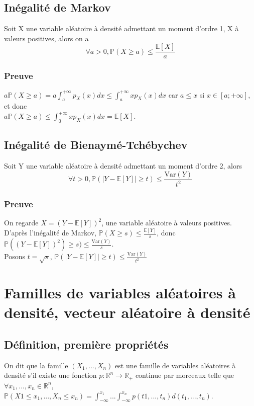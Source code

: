 \documentclass[a4paper,10pt]{book} %
\newcommand{\R}{\mathbb{R}}
\newcommand{\E}{\mathbb{E}} %
\renewcommand{\P}{\mathbb{P}} %
\newcommand\abs[1]{\left|#1\right|}
\newcommand{\Var}{\mathrm{Var}} %
\begin{document}
\subsection{Inégalité de Markov}
Soit X une variable aléatoire à densité admettant un moment d'ordre 1, X à valeurs positives, alors on a
$$\forall a>0, \P(X\geq a)\leq \frac{\E[X]}{a}$$

\subsubsection{Preuve}
$\displaystyle a\P(X\geq a) = a\int_a^{+\infty} p_X(x)dx \leq \int_a^{+\infty}xp_X(x)dx$ car $a \leq x$ si $x \in [a; +\infty]$, et donc\\
$\displaystyle a\P(X\geq a) \leq \int_0^{+\infty} xp_X(x)dx = \E[X]$.

\subsection{Inégalité de Bienaymé-Tchébychev}
Soit Y une variable aléatoire à densité admettant un moment d'ordre 2, alors 
$$\forall t > 0, \P(\abs{Y-\E[Y]}\geq t)\leq \frac{\Var(Y)}{t^2}$$

\subsubsection{Preuve}
On regarde $X = (Y - \E[Y])^2$, une variable aléatoire à valeurs positives.\\
D'après l'inégalité de Markov, $\P(X\geq s)\leq \frac{\E[Y]}{s}$, donc $\P((Y-\E[Y])^2)\geq s)\leq \frac{\Var(Y)}{s}$.\\

Posons $t = \sqrt{s}$, $\P(\abs{Y - \E[Y]}\geq t) \leq \frac{\Var(Y)}{t^2}$

\section{Familles de variables aléatoires à densité, vecteur aléatoire à densité}
\subsection{Définition, première propriétés}
On dit que la famille $(X_1,...,X_n)$ est une famille de variables aléatoires à densité s'il existe une fonction $p : \R^n \rightarrow \R_+$ continue par morceaux telle que\\
$\forall x_1,...,x_n\in \R^n$, $\P(X1\leq x_1, ..., X_n\leq x_n) = \int_{-\infty}^{x_1} ... \int_{-\infty}^{x_n} p(t1,...,t_n)d(t_1,...,t_n)$.\\
\end{document}

